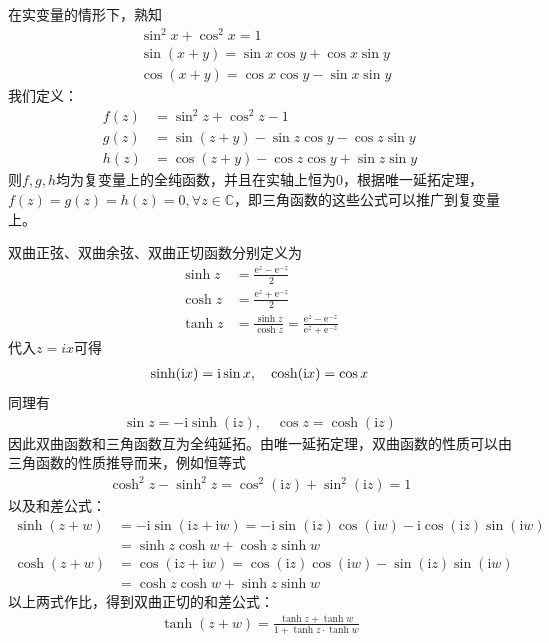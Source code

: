 \begin{example}[三角函数]
    在实变量的情形下，熟知\begin{align*}
        &\sin^2 x+\cos^2 x=1\\
        &\sin(x+y)=\sin x\cos y+\cos x\sin y\\
        &\cos(x+y)=\cos x\cos y-\sin x\sin y
    \end{align*}
    我们定义：\begin{align*}
        f(z)&=\sin^2 z+\cos^2 z-1\\
        g(z)&=\sin(z+y)-\sin z\cos y-\cos z\sin y\\
        h(z)&=\cos(z+y)-\cos z\cos y+\sin z\sin y
    \end{align*}
    则$f,g,h$均为复变量上的全纯函数，并且在实轴上恒为0，根据唯一延拓定理，$f(z)=g(z)=h(z)=0,\forall z\in\mathbb{C}$，即三角函数的这些公式可以推广到复变量上。
\end{example}
\begin{example}[双曲函数]
    双曲正弦、双曲余弦、双曲正切函数分别定义为
    \begin{align*}
        \sinh z&=\frac{\mathrm{e}^z-\mathrm{e}^{-z}}{2}\\
        \cosh z&=\frac{\mathrm{e}^z+\mathrm{e}^{-z}}{2}\\
        \tanh z&=\frac{\sinh z}{\cosh z}=\frac{\mathrm{e}^z-\mathrm{e}^{-z}}{\mathrm{e}^z+\mathrm{e}^{-z}}
    \end{align*}
    代入$z=ix$可得
    \begin{align*}
        \sinh (\mathrm{i} x)=\mathrm{i}\sin x,\quad \cosh (\mathrm{i} x)=\cos x
    \end{align*}
    同理有\begin{align*}
        \sin z=-\mathrm{i}\sinh (\mathrm{i}z),\quad \cos z=\cosh (\mathrm{i}z)
    \end{align*}
    因此双曲函数和三角函数互为全纯延拓。由唯一延拓定理，双曲函数的性质可以由三角函数的性质推导而来，例如恒等式
    \begin{align*}
        \cosh^2 z-\sinh^2 z=\cos^2 (\mathrm{i}z)+\sin^2 (\mathrm{i}z)=1
    \end{align*}
    以及和差公式：
    \begin{align*}
        \sinh(z+w)&=-\mathrm{i}\sin(\mathrm{i}z+\mathrm{i}w)=-\mathrm{i}\sin(\mathrm{i}z)\cos(\mathrm{i}w)-\mathrm{i}\cos(\mathrm{i}z)\sin(\mathrm{i}w)\\
        &=\sinh z\cosh w+\cosh z\sinh w\\
        \cosh(z+w)&=\cos(\mathrm{i}z+\mathrm{i}w)=\cos(\mathrm{i}z)\cos(\mathrm{i}w)-\sin(\mathrm{i}z)\sin(\mathrm{i}w)\\
        &=\cosh z\cosh w+\sinh z\sinh w
    \end{align*}
    以上两式作比，得到双曲正切的和差公式：
    \begin{align*}
        \tanh(z+w)=\frac{\tanh z+\tanh w}{1+\tanh z\cdot\tanh w}
    \end{align*}
\end{example}
